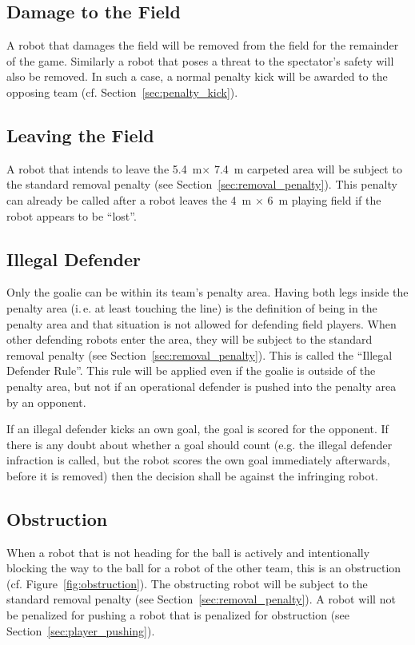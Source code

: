 \documentclass[12pt]{article}
\newcommand{\ie}{\mbox{i.\,e.}\xspace}
\newcommand{\cf}{\mbox{cf.}\xspace}
\newcommand{\TotalWidth}{5.4~m\xspace}
\newcommand{\TotalLength}{7.4~m\xspace }
\begin{document}
\subsection{Damage to the Field}

A robot that damages the field will be removed from the field for the remainder of the game. Similarly a robot that poses a threat to the spectator's safety will also be removed. In such a case, a normal penalty kick will be awarded to the opposing team (\cf Section~\ref{sec:penalty_kick}).

\subsection{Leaving the Field}

A robot that intends to leave the \TotalWidth $\times$ \TotalLength carpeted area will be subject to the standard removal penalty (see
Section~\ref{sec:removal_penalty}). This penalty can already be called after a robot leaves the 4~m $\times$ 6~m playing field if the robot appears to be ``lost''.

\subsection{Illegal Defender}

Only the goalie can be within its team's penalty area. Having both legs inside the penalty area (\ie at least touching the line) is the definition of being in the penalty area and that situation is not allowed for defending field players. When other defending robots enter the area, they will be subject to the standard removal penalty (see Section~\ref{sec:removal_penalty}). This is called the ``Illegal Defender Rule''. This rule will be applied even if the goalie is outside of the penalty area, but not if an operational defender is pushed into the penalty area by an opponent.

If an illegal defender kicks an own goal, the goal is scored for the opponent. If there is any doubt about whether a goal should count (e.g. the illegal defender infraction is called, but the robot scores the own goal immediately afterwards, before it is removed) then the decision shall be against the infringing robot.

\subsection{Obstruction}

When a robot that is not heading for the ball is actively and intentionally blocking the way to the ball for a robot of the other team, this is an obstruction (\cf Figure~\ref{fig:obstruction}). The obstructing robot will be subject to the standard removal penalty (see Section~\ref{sec:removal_penalty}). A robot will not be penalized for pushing a robot that is penalized for obstruction (see Section~\ref{sec:player_pushing}).
\end{document}
